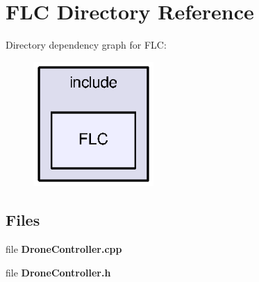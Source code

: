 \section{F\-L\-C Directory Reference}
\label{dir_94da0d2f50ed982b83b0a0d408f433f1}
Directory dependency graph for F\-L\-C\-:
\nopagebreak
\begin{figure}[H]
\begin{center}
\leavevmode
\includegraphics[width=130pt]{dir_94da0d2f50ed982b83b0a0d408f433f1_dep}
\end{center}
\end{figure}
\subsection*{Files}
\begin{DoxyCompactItemize}
\item 
file {\bf Drone\-Controller.\-cpp}
\item 
file {\bf Drone\-Controller.\-h}
\end{DoxyCompactItemize}
